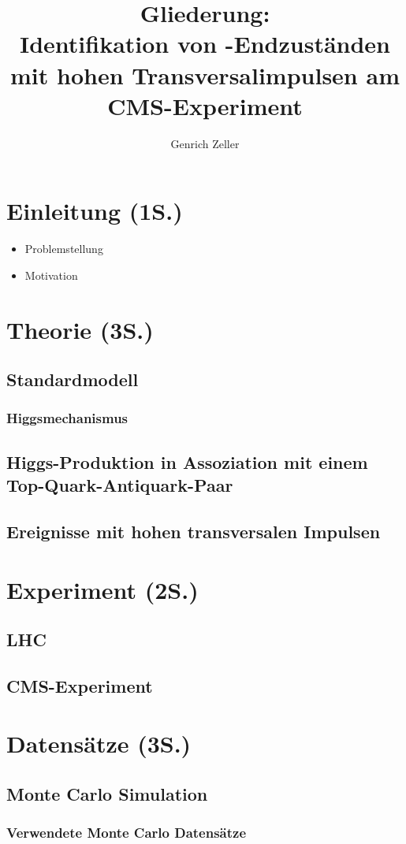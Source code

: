 \documentclass[12pt,a4paper]{article}
\title{Gliederung:\\\textbf{Identifikation von \tth -Endzuständen mit hohen Transversalimpulsen am CMS-Experiment}}
\author{Genrich Zeller}
\begin{document}
\maketitle
\tableofcontents
\newpage
\section{Einleitung (1S.)}
\begin{itemize}
\item Problemstellung
\item Motivation
\end{itemize}
\section{Theorie (3S.)}
\subsection{Standardmodell}
\subsubsection{Higgsmechanismus}
\subsection{Higgs-Produktion in Assoziation mit einem Top-Quark-Antiquark-Paar}
\subsection{Ereignisse mit hohen transversalen Impulsen}
\section{Experiment (2S.)}
\subsection{LHC}
\subsection{CMS-Experiment}
\section{Datensätze (3S.)}
\subsection{Monte Carlo Simulation}
\subsubsection{Verwendete Monte Carlo Datensätze}
\end{document}
